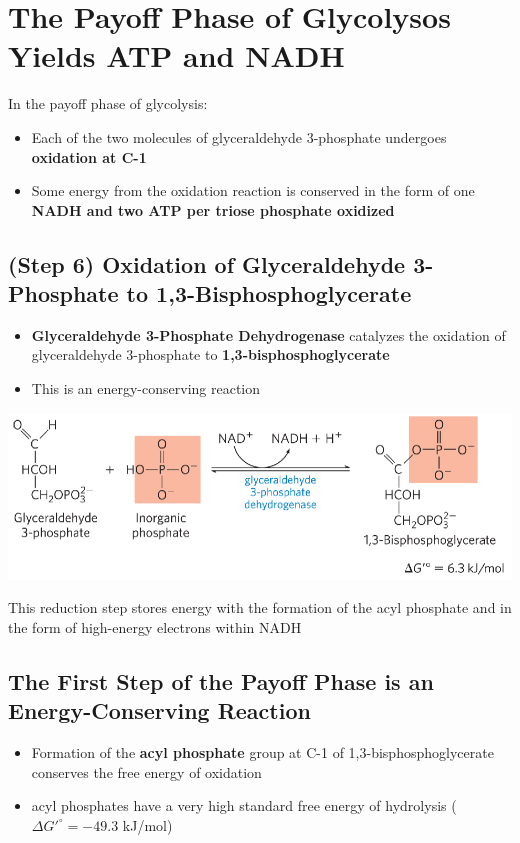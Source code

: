 \documentclass[10pt]{article}
\begin{document}
\section*{The Payoff Phase of Glycolysos Yields ATP and NADH}
In the payoff phase of glycolysis:
\begin{itemize}
	\item Each of the two molecules of glyceraldehyde 3-phosphate undergoes \textbf{oxidation at C-1}
	\item Some energy from the oxidation reaction is conserved in the form of one \textbf{NADH and two ATP per triose phosphate oxidized}
\end{itemize}

\subsection*{(Step 6) Oxidation of Glyceraldehyde 3-Phosphate to 1,3-Bisphosphoglycerate}
\begin{itemize}
	\item \textbf{Glyceraldehyde 3-Phosphate Dehydrogenase} catalyzes the oxidation of glyceraldehyde 3-phosphate to \textbf{1,3-bisphosphoglycerate}
	\item This is an energy-conserving reaction
\end{itemize}
\begin{center} 
	\includegraphics*[width=\textwidth]{L1_12.png}
\end{center}
This reduction step stores energy with the formation of the acyl phosphate and in the form of high-energy electrons within NADH

\subsection*{The First Step of the Payoff Phase is an Energy-Conserving Reaction}
\begin{itemize}
	\item Formation of the \textbf{acyl phosphate} group at C-1 of 1,3-bisphosphoglycerate conserves the free energy of oxidation
	\item acyl phosphates have a very high standard free energy of hydrolysis ($\Delta G'^\circ = -49.3$ kJ/mol)
\end{itemize}
\end{document}
